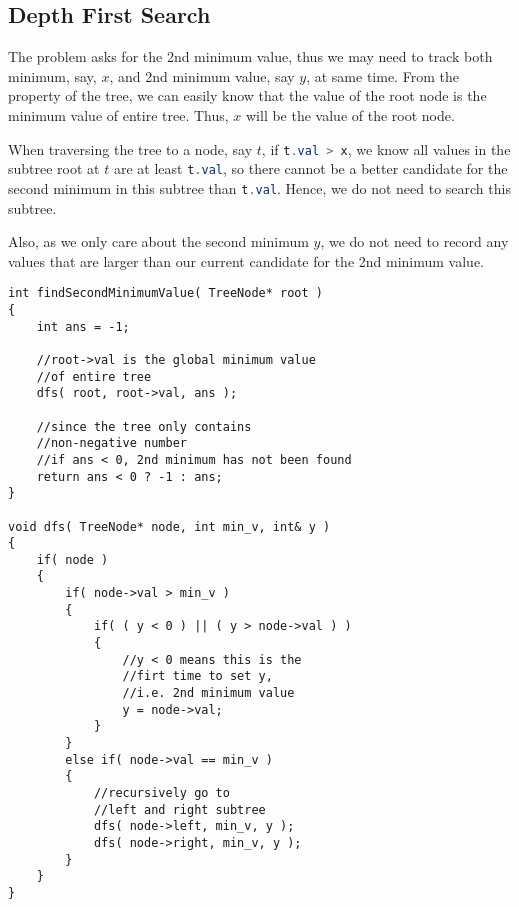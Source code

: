 \subsection{Depth First Search}
The problem asks for the 2nd minimum value, thus we may need to track both minimum, say, $x$, and 2nd minimum value, say $y$, at same time. From the property of the tree, we can easily know that the value of the root node is the minimum value of entire tree. Thus, $x$ will be the value of the root node.

When traversing the tree to a node, say $t$, if \lstinline[language=Java, basicstyle=\small\ttfamily, keywordstyle=\bfseries\color{green!40!black}]|t.val > x|, we know all values in the subtree root at $t$ are at least \lstinline[language=Java, basicstyle=\small\ttfamily, keywordstyle=\bfseries\color{green!40!black}]|t.val|, so there cannot be a better candidate for the second minimum in this subtree than \lstinline[language=Java, basicstyle=\small\ttfamily, keywordstyle=\bfseries\color{green!40!black}]|t.val|. Hence, we do not need to search this subtree.

Also, as we only care about the second minimum $y$, we do not need to record any values that are larger than our current candidate for the 2nd minimum value.

\setcounter{lstlisting}{0}
\begin{lstlisting}[style=customc, caption={DFS}]
int findSecondMinimumValue( TreeNode* root )
{
    int ans = -1;

    //root->val is the global minimum value
    //of entire tree
    dfs( root, root->val, ans );

    //since the tree only contains
    //non-negative number
    //if ans < 0, 2nd minimum has not been found
    return ans < 0 ? -1 : ans;
}

void dfs( TreeNode* node, int min_v, int& y )
{
    if( node )
    {
        if( node->val > min_v )
        {
            if( ( y < 0 ) || ( y > node->val ) )
            {
                //y < 0 means this is the
                //firt time to set y,
                //i.e. 2nd minimum value
                y = node->val;
            }
        }
        else if( node->val == min_v )
        {
            //recursively go to
            //left and right subtree
            dfs( node->left, min_v, y );
            dfs( node->right, min_v, y );
        }
    }
}
\end{lstlisting}